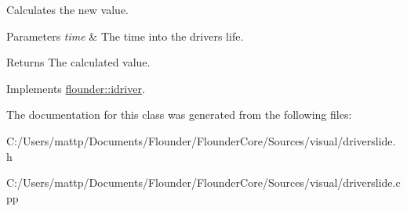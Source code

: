 Calculates the new value. 


\begin{DoxyParams}{Parameters}
{\em time} & The time into the drivers life. \\
\hline
\end{DoxyParams}
\begin{DoxyReturn}{Returns}
The calculated value. 
\end{DoxyReturn}


Implements \hyperlink{classflounder_1_1idriver_a034c4159dc98c4c37ffdfaae64e4a16d}{flounder\+::idriver}.



The documentation for this class was generated from the following files\+:\begin{DoxyCompactItemize}
\item 
C\+:/\+Users/mattp/\+Documents/\+Flounder/\+Flounder\+Core/\+Sources/visual/driverslide.\+h\item 
C\+:/\+Users/mattp/\+Documents/\+Flounder/\+Flounder\+Core/\+Sources/visual/driverslide.\+cpp\end{DoxyCompactItemize}
